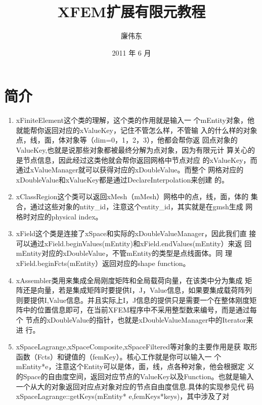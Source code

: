\documentclass{article}
\begin{document}
\title{XFEM扩展有限元教程}

\author{廉伟东}

\date{2011 年 6 月}

\maketitle

\tableofcontents

\section{简介}
\label{sec:intro}

\begin{enumerate}
\item xFiniteElement这个类的理解，这个类的作用就是输入一
  个mEntity对象，他就能帮你返回对应的xValueKey，记住不管怎么样，不管输
  入的什么样的对象点，线，面，体对象等（dim=0，1，2，3），他都会帮你返
  回点对象的ValueKey,也就是说那些对象都被最终分解为点对象，因为有限元计
  算关心的是节点信息，因此经过这类他就会帮你返回网格中节点对应
  的xValueKey，而通过xValueManager就可以获得对应的xDoubleValue。而整个
  网格对应的xDoubleValue和xValueKey都是通过DeclareInterpolation来创建
  的。
\item xClassRegion这个类可以返回xMesh（mMesh）网格中的点，线，面，体的
  集合，通过这些对象的ntity\_id，注意这个entity\_id，其实就是在gmsh生成
  网格时对应的physical index。
\item xField这个类是连接了xSpace和实际的xDoubleValueManager，因此我们直
  接可以通过xField.beginValues(mEntity)和xField.endValues(mEntity）来返
  回mEntity对应的xDoubleValue，不管mEntity的类型是点线面体。同
  理xField.beginFcts(mEntity）返回对应的shape function。
\item xAssembler类用来集成全局刚度矩阵和全局载荷向量，在该类中分为集成
  矩阵还是向量，若是集成矩阵时要提供I，J，Value信息，如果要集成载荷阵列
  则要提供I,Value信息。并且实际上I，J信息的提供只是需要一个在整体刚度矩
  阵中的位置信息即可，在当前XFEM程序中不采用整型数来编号，而是通过每个
  节点的xDoubleValue的指针，也就是xDoubleValueManager中的Iterator来进
  行。
\item xSpaceLagrange,xSpaceComposite,xSpaceFiltered等对象的主要作用是获
  取形函数（Fcts）和键值的（femKey）。核心工作就是你可以输入一
  个mEntity{*}e，注意这个Entity可以是体，面，线，点各种对象，他会根据定
  义的Space的自由度空间，返回对应节点的ValueKey以及Function。也就是输入
  一个从大的对象返回对应点对象对应的节点自由度信息.具体的实现参见代
  码xSpaceLagrange::getKeys(mEntity{*} e,femKeys{*}keys)，其中涉及了对

\end{enumerate}
\end{document}
